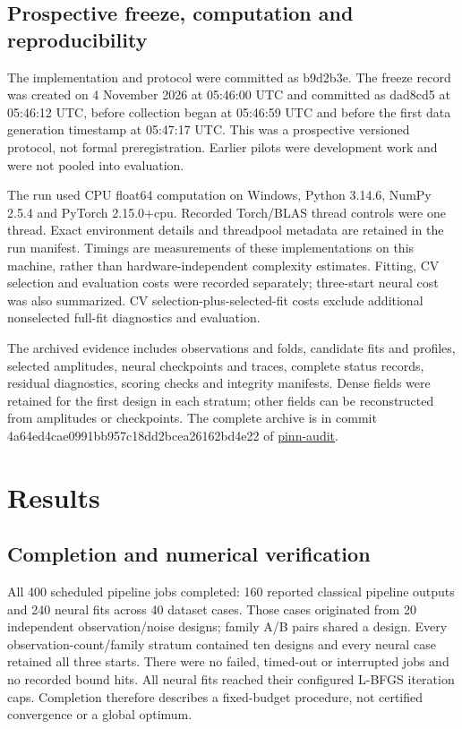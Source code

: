 \documentclass[10pt,a4paper]{article}
\begin{document}
\subsection{Prospective freeze, computation and reproducibility}

The implementation and protocol were committed as b9d2b3e. The freeze record
was created on 4 November 2026 at 05:46:00 UTC and committed as dad8cd5 at
05:46:12 UTC, before collection began at 05:46:59 UTC and before the first data
generation timestamp at 05:47:17 UTC. This was a prospective versioned protocol,
not formal preregistration. Earlier pilots were development work and were not
pooled into evaluation.

The run used CPU float64 computation on Windows, Python 3.14.6, NumPy 2.5.4 and
PyTorch 2.15.0+cpu. Recorded Torch/BLAS thread controls were one thread. Exact
environment details and threadpool metadata are retained in the run manifest.
Timings are measurements of these implementations on this machine, rather than
hardware-independent complexity estimates. Fitting, CV selection and evaluation
costs were recorded separately; three-start neural cost was also summarized.
CV selection-plus-selected-fit costs exclude additional nonselected full-fit
diagnostics and evaluation.

The archived evidence includes observations and folds, candidate fits and
profiles, selected amplitudes, neural checkpoints and traces, complete status
records, residual diagnostics, scoring checks and integrity manifests. Dense
fields were retained for the first design in each stratum; other fields can be
reconstructed from amplitudes or checkpoints. The complete archive is in
commit 4a64ed4cae0991bb957c18dd2bcea26162bd4e22 of
\href{https://github.com/ridoy1211/pinn-audit/tree/4a64ed4cae0991bb957c18dd2bcea26162bd4e22}{pinn-audit}.

\section{Results}

\subsection{Completion and numerical verification}

All 400 scheduled pipeline jobs completed: 160 reported classical pipeline
outputs and 240 neural fits across 40 dataset cases. Those cases originated
from 20 independent observation/noise designs; family A/B pairs shared a design.
Every observation-count/family stratum contained ten designs and every neural
case retained all three starts. There were no failed, timed-out or interrupted
jobs and no recorded bound hits. All neural fits reached their configured
L-BFGS iteration caps. Completion therefore describes a fixed-budget procedure,
not certified convergence or a global optimum.
\end{document}
